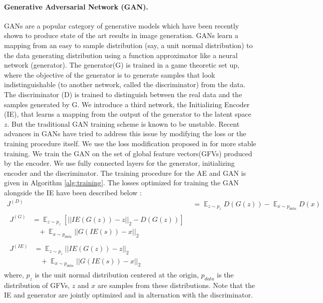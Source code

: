 \documentclass[10pt,twocolumn,letterpaper]{article}
\DeclareMathOperator{\E}{\mathbb{E}}
\begin{document}
\paragraph{Generative Adversarial Network (GAN).}
GANs are a popular category of generative models which have been recently shown to produce state of the art results in image generation. GANs learn a mapping from an easy to sample distribution (say, a unit normal distribution) to the data generating distribution using a function approximator like a neural network (generator). The generator(G) is trained in a game theoretic set up, where the objective of the generator is to generate samples that look indistinguishable (to another network, called the discriminator) from the data. The discriminator (D) is trained to distinguish between the real data and the samples generated by G. We introduce a third network, the Initializing Encoder (IE), that learns a mapping from the output of the generator to the latent space $z$. But the traditional GAN training scheme is known to be unstable. Recent advances in GANs \cite{wgan,gan,gan_num} have tried to address this issue by modifying the loss or the training procedure itself. We use the loss modification proposed in \cite{wgan} for more stable training. We train the GAN on the set of global feature vectors(GFVs) produced by the encoder. We use fully connected layers for the generator, initializing encoder and the discriminator. The training procedure for the AE and GAN is given in Algorithm \ref{alg:training}. The losses optimized for training the GAN alongside the IE have been described below :
\setlength{\belowdisplayskip}{0pt} \setlength{\belowdisplayshortskip}{0pt}
\setlength{\abovedisplayskip}{0pt} \setlength{\abovedisplayshortskip}{0pt}
\begin{align}
\label{eq:gan}
    J^{(D)} &= \E_{z\sim p_z}{D(G(z))} - \E_{x\sim p_{data}}{D(x)}\\
\begin{split}
 J^{(G)} &= \E_{z\sim p_z}{[||IE(G(z)) - z||_2 - D(G(z)) ]} \\
    & \ \ \ \ + \E_{x\sim p_{data}}{||G(IE(s)) - x||_2} 
\end{split}\\
\begin{split}
\label{eq:ie}
    J^{(IE)} &= \E_{z\sim p_z}{||IE(G(z)) - z||_2} \\
              & \ \ \ \ + \E_{x\sim p_{data}}{||G(IE(s)) - x||_2}
\end{split}
\end{align}
where, $p_z$ is the unit normal distribution centered at the origin, $p_{data}$ is the distribution of GFVs, $z$ and $x$ are samples from these distributions. Note that the IE and generator are jointly optimized and in alternation with the discriminator. 
\end{document}
